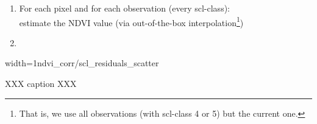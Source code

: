 \begin{enumerate}
    \item For each pixel and for each observation (every scl-class):\\
          estimate the NDVI value (via out-of-the-box interpolation\footnote{That is, we use all observations (with scl-class 4 or 5) but the current one.})
    \item
\end{enumerate}







\begin{my_figure}[h]{width=1\textwidth}{ndvi_corr/scl_residuals_scatter}
    \caption{XXX caption XXX}
    \label{fig:ndvi_corr/scl_residuals_scatter}
\end{my_figure}
